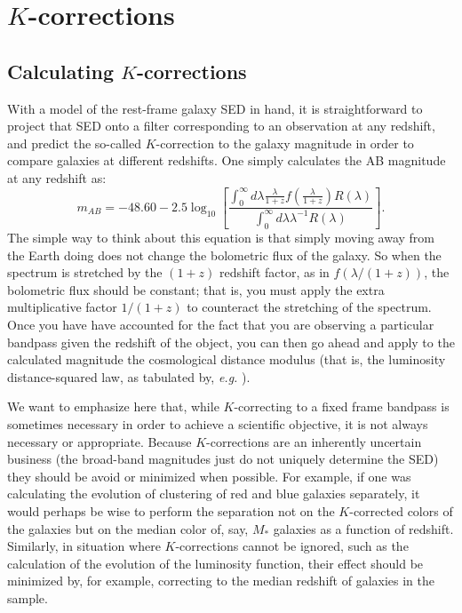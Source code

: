 \documentclass[10pt,preprint]{aastex}
\begin{document}
\section{$K$-corrections}
\label{kcorrection}

\subsection{Calculating $K$-corrections}

With a model of the rest-frame galaxy SED in hand, it is 
straightforward to project that SED onto a filter corresponding to 
an observation at any redshift, and predict the so-called
$K$-correction to the galaxy magnitude in order to compare galaxies 
at different redshifts. One simply calculates the AB magnitude at 
any redshift as:
\begin{equation}
m_{AB} = -48.60 - 2.5 \log_{10}\left[
\frac{\int_{0}^{\infty} d\lambda \frac{\lambda}{1+z}
f(\frac{\lambda}{1+z}) R(\lambda)}
{\int_{0}^{\infty} d\lambda \lambda^{-1} R(\lambda)}\right].
\end{equation}
The simple way to think about this equation is that simply moving away
from the Earth doing does not change the bolometric flux of the
galaxy. So when the spectrum is stretched by the $(1+z)$ redshift
factor, as in $f(\lambda/(1+z))$, the bolometric flux should be
constant; that is, you must apply the extra multiplicative factor
$1/(1+z)$ to counteract the stretching of the spectrum. Once you have
have accounted for the fact that you are observing a particular
bandpass given the redshift of the object, you can then go ahead and
apply to the calculated magnitude the cosmological distance modulus
(that is, the luminosity distance-squared law, as tabulated by, {\it
e.g.} \citealt{hogg97a}).

We want to emphasize here that, while $K$-correcting to a fixed frame
bandpass is sometimes necessary in order to achieve a scientific
objective, it is not always necessary or appropriate. Because
$K$-corrections are an inherently uncertain business (the broad-band
magnitudes just do not uniquely determine the SED) they should be
avoid or minimized when possible. For example, if one was calculating
the evolution of clustering of red and blue galaxies separately, it
would perhaps be wise to perform the separation not on the
$K$-corrected colors of the galaxies but on the median color of, say,
$M_\ast$ galaxies as a function of redshift. Similarly, in situation
where $K$-corrections cannot be ignored, such as the calculation of
the evolution of the luminosity function, their effect should be
minimized by, for example, correcting to the median redshift of
galaxies in the sample.
\end{document}
